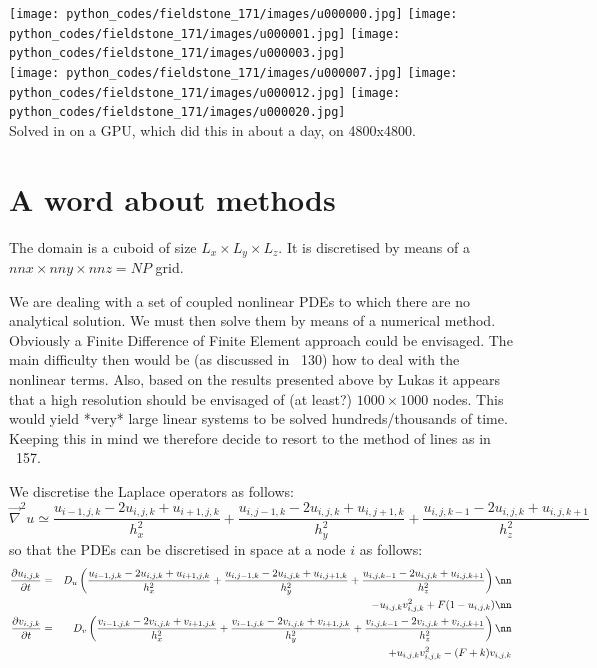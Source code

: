 \begin{center}
\texttt{[image: python\_codes/fieldstone\_171/images/u000000.jpg]}
\texttt{[image: python\_codes/fieldstone\_171/images/u000001.jpg]}
\texttt{[image: python\_codes/fieldstone\_171/images/u000003.jpg]}\\
\texttt{[image: python\_codes/fieldstone\_171/images/u000007.jpg]}
\texttt{[image: python\_codes/fieldstone\_171/images/u000012.jpg]}
\texttt{[image: python\_codes/fieldstone\_171/images/u000020.jpg]}\\
{\captionfont Solved in on a GPU, which did this in about a day, on 4800x4800.}
\end{center}

\section*{A word about methods}

The domain is a cuboid of size $L_x \times L_y \times L_z$.
It is discretised by means of a $nnx \times nny \times nnz = NP$ grid.

We are dealing with a set of coupled nonlinear PDEs to which there are no analytical solution.
We must then solve them by means of a numerical method. 
Obviously a Finite Difference of Finite Element approach could be envisaged. The main difficulty then
would be (as discussed in \stone~130) how to deal with the nonlinear terms. Also, based on 
the results presented above by Lukas it appears that a high resolution should be envisaged
of (at least?) $1000\times 1000$ nodes. This would yield *very* large linear systems to be 
solved hundreds/thousands of time.
Keeping this in mind we therefore decide to resort to the method of lines as in \stone~157.

We discretise the Laplace operators as follows:
\[
\vec\nabla^2 u \simeq 
\frac{u_{i-1,j,k}-2u_{i,j,k}+u_{i+1,j,k}}{h_x^2} + 
\frac{u_{i,j-1,k}-2u_{i,j,k}+u_{i,j+1,k}}{h_y^2} + 
\frac{u_{i,j,k-1}-2u_{i,j,k}+u_{i,j,k+1}}{h_z^2} 
\]
so that the PDEs can be discretised in space at a node $i$ as follows:
\begin{eqnarray}
\frac{\partial u_{i,j,k}}{\partial t} 
&=& D_u 
\left(
\frac{u_{i-1,j,k}-2u_{i,j,k}+u_{i+1,j,k}}{h_x^2} + 
\frac{u_{i,j-1,k}-2u_{i,j,k}+u_{i,j+1,k}}{h_y^2} + 
\frac{u_{i,j,k-1}-2u_{i,j,k}+u_{i,j,k+1}}{h_z^2} 
\right) \nn\\
&&- u_{i,j,k}v_{i,j,k}^2 + F(1-u_{i,j,k}) 
\nn\\
\frac{\partial v_{i,j,k}}{\partial t} &=& D_v 
\left(
\frac{v_{i-1,j,k}-2v_{i,j,k}+v_{i+1,j,k}}{h_x^2} + 
\frac{v_{i-1,j,k}-2v_{i,j,k}+v_{i+1,j,k}}{h_y^2} + 
\frac{v_{i,j,k-1}-2v_{i,j,k}+v_{i,j,k+1}}{h_z^2} 
\right) \nn\\
&&
+ u_{i,j,k}v_{i,j,k}^2 - (F+k)v_{i,j,k}
\end{eqnarray}

